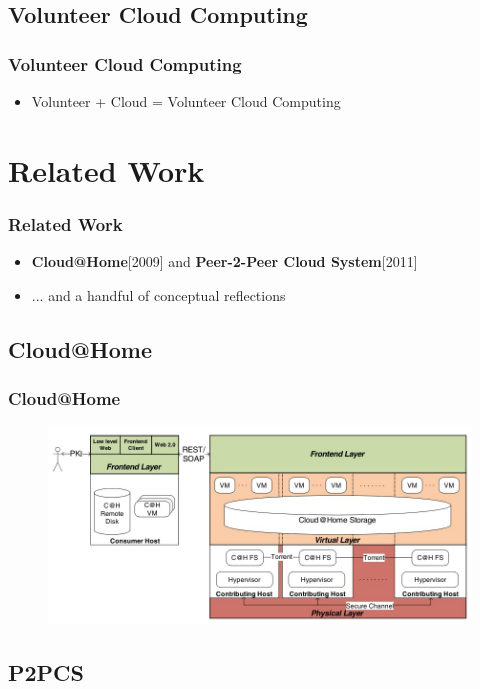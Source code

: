 \documentclass{beamer}
\begin{document}
\subsection{Volunteer Cloud Computing}

\begin{frame}
  \frametitle{Volunteer Cloud Computing}
  \begin{itemize}
  \item Volunteer + Cloud = Volunteer Cloud Computing
  \end{itemize}
\end{frame}

\section{Related Work}
\begin{frame}
  \frametitle{Related Work}
  \begin{itemize}
  \item \textbf{Cloud@Home}[2009] and \textbf{Peer-2-Peer Cloud System}[2011]
  \item ... and a handful of conceptual reflections
  \end{itemize}
\end{frame}

\subsection{Cloud@Home}

\begin{frame}
 \frametitle{Cloud@Home}
     \begin{figure}[cathome]
      \includegraphics[width=\textwidth,height=0.8\textheight,keepaspectratio]{cathome_arch.jpg}
    \end{figure}
\end{frame}

\subsection{P2PCS}
\end{document}
